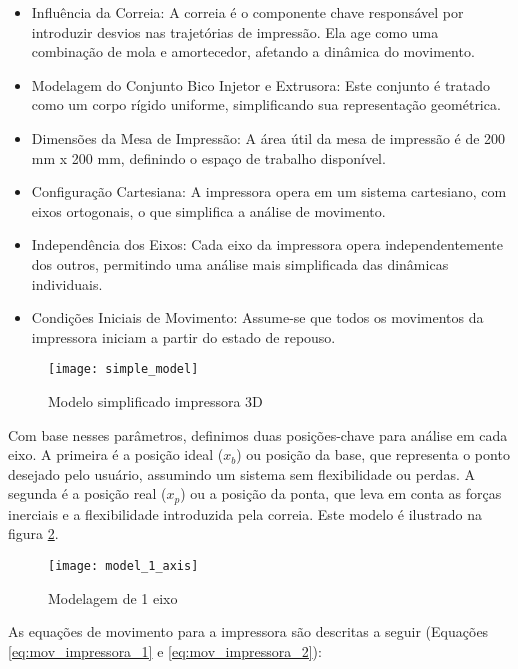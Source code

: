 \begin{itemize}
    \item Influência da Correia: A correia é o componente chave responsável por introduzir desvios nas trajetórias de impressão. Ela age como uma combinação de mola e amortecedor, afetando a dinâmica do movimento.
    \item Modelagem do Conjunto Bico Injetor e Extrusora: Este conjunto é tratado como um corpo rígido uniforme, simplificando sua representação geométrica.
    \item Dimensões da Mesa de Impressão: A área útil da mesa de impressão é de 200 mm x 200 mm, definindo o espaço de trabalho disponível.
    \item Configuração Cartesiana: A impressora opera em um sistema cartesiano, com eixos ortogonais, o que simplifica a análise de movimento.
    \item Independência dos Eixos: Cada eixo da impressora opera independentemente dos outros, permitindo uma análise mais simplificada das dinâmicas individuais.
    \item Condições Iniciais de Movimento: Assume-se que todos os movimentos da impressora iniciam a partir do estado de repouso.
\end{itemize}

\begin{figure}[H]
    \centering
    \caption{Modelo simplificado impressora 3D}
    \texttt{[image: simple\_model]}
    \label{fig:simple_model}
\end{figure}

Com base nesses parâmetros, definimos duas posições-chave para análise em cada eixo. A primeira é a posição ideal (\(x_b\)) ou posição da base, que representa o ponto desejado pelo usuário, assumindo um sistema sem flexibilidade ou perdas. A segunda é a posição real (\(x_p\)) ou a posição da ponta, que leva em conta as forças inerciais e a flexibilidade introduzida pela correia. Este modelo é ilustrado na figura \ref{fig:model_1_axis}.

\begin{figure}[H]
    \centering
    \caption{Modelagem de 1 eixo}
    \texttt{[image: model\_1\_axis]}

    \label{fig:model_1_axis}
\end{figure}

As equações de movimento para a impressora são descritas a seguir (Equações \ref{eq:mov_impressora_1} e \ref{eq:mov_impressora_2}):

